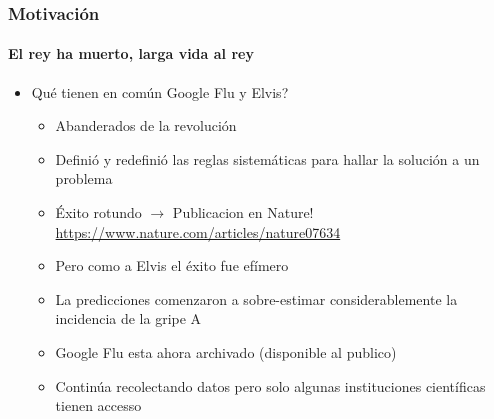 \documentclass[
  shownotes,
  xcolor={svgnames},
  hyperref={colorlinks,citecolor=DarkBlue,linkcolor=DarkRed,urlcolor=DarkBlue}
  , aspectratio=169]{beamer}
\begin{document}
\begin{frame}
\frametitle{Motivación}
\framesubtitle{El rey ha muerto, larga vida al rey}
  \begin{itemize}
    \item Qué tienen en común Google Flu y Elvis?
    \bigskip
    \begin{itemize}
      \item Abanderados de la revolución
      \medskip
      \item Definió y redefinió las reglas sistemáticas para hallar la solución a un problema
      \medskip
      \item Éxito rotundo $\rightarrow$ Publicacion en Nature! \url{https://www.nature.com/articles/nature07634}
      \medskip
      \item Pero como a Elvis el éxito fue efímero
      \medskip
      \item La predicciones comenzaron a sobre-estimar considerablemente la incidencia de la gripe A
      \medskip
      \item Google Flu esta ahora archivado (disponible al publico)
      \medskip
      \item Continúa recolectando datos pero solo algunas instituciones científicas tienen accesso 
    \end{itemize}  
  \end{itemize}  
\end{frame}
\end{document}
